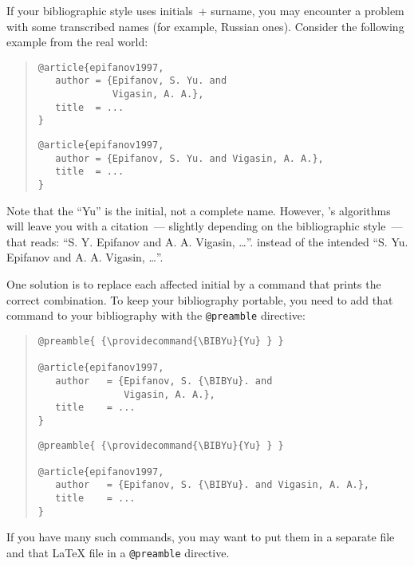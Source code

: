 
If your bibliographic style uses initials~+ surname, you may encounter
a problem with some transcribed names (for example, Russian ones).
Consider the following example from the real world:
\begin{quote}
\begin{narrowversion}
\begin{verbatim}
@article{epifanov1997,
   author = {Epifanov, S. Yu. and
             Vigasin, A. A.},
   title  = ...
}
\end{verbatim}
\end{narrowversion}
\begin{wideversion}
\begin{verbatim}
@article{epifanov1997,
   author = {Epifanov, S. Yu. and Vigasin, A. A.},
   title  = ...
}
\end{verbatim}
\end{wideversion}
\end{quote}
Note that the ``Yu'' is the initial, not a complete name. However,
\BibTeX{}'s algorithms will leave you with a citation~--- 
slightly depending on the bibliographic style~--- that reads:
``S. Y. Epifanov and A. A. Vigasin, \dots{}''. instead of the intended
``S. Yu. Epifanov and A. A. Vigasin, \dots{}''.

One solution is to replace each affected initial by a command that 
prints the correct combination.  To keep your bibliography portable,
you need to add that command to your bibliography with the
\texttt{@preamble} directive:
\begin{quote}
\begin{narrowversion}
\begin{verbatim}
@preamble{ {\providecommand{\BIBYu}{Yu} } }

@article{epifanov1997,
   author   = {Epifanov, S. {\BIBYu}. and
               Vigasin, A. A.},
   title    = ...
}
\end{verbatim}
\end{narrowversion}
\begin{wideversion}
\begin{verbatim}
@preamble{ {\providecommand{\BIBYu}{Yu} } }

@article{epifanov1997,
   author   = {Epifanov, S. {\BIBYu}. and Vigasin, A. A.},
   title    = ...
}
\end{verbatim}
\end{wideversion}
\end{quote}
If you have many such commands, you may want to put them in a separate
file and  that \LaTeX{} file in a \texttt{@preamble}
directive.

